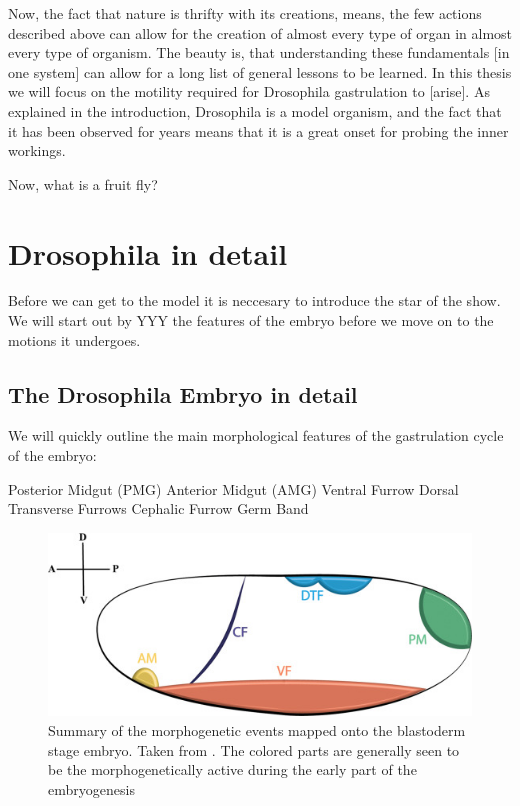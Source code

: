 Now, the fact that nature is thrifty with its creations, means, the few actions described above can allow for the creation of almost every type of organ in almost every type of organism. The beauty is, that understanding these fundamentals [in one system] can allow for a long list of general lessons to be learned. In this thesis we will focus on the motility required for Drosophila gastrulation to [arise]. As explained in the introduction, Drosophila is a model organism, and the fact that it has been observed for years means that it is a great onset for probing the inner workings.

Now, what is a fruit fly? 

\section{Drosophila in detail}
Before we can get to the model it is neccesary to introduce the star of the show. We will start out by YYY the features of the embryo before we move on to the motions it undergoes. 
\subsection{The Drosophila Embryo in detail}
\label{sec:drosophila-embryo-detail} 
We will quickly outline the main morphological features of the gastrulation cycle of the embryo:
\begin{outline}
    \1 Posterior Midgut (PMG)
    \1 Anterior Midgut (AMG)
    \1 Ventral Furrow
    \1 Dorsal Transverse Furrows
    \1 Cephalic Furrow
    \1 Germ Band
\end{outline}

\begin{figure}[H]
    \centering
    \includegraphics[width = 0.7\linewidth]{chapters/Theory/figures/morphogenic_events.jpg}
    \caption{Summary of the morphogenetic events mapped onto the blastoderm stage embryo. Taken from \cite{gheisari2020gastrulation}. The colored parts are generally seen to be the morphogenetically active during the early part of the embryogenesis}
    \label{fig:enter-label}
\end{figure}

